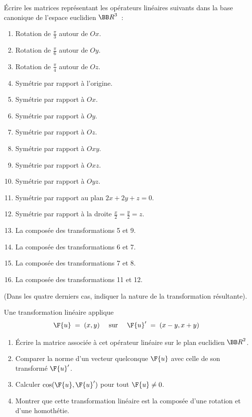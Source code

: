 \documentclass[12pt,french,oneside,a4paper]{memoir} %
\begin{document}
\begin{exo}
Écrire les matrices représentant les opérateurs linéaires suivants dans la base canonique de l'espace euclidien ${\BB R}^3$~:
\begin{enumerate}
\item Rotation de $\frac{\pi}{3}$ autour de $Ox$. 
\item Rotation de $\frac{\pi}{6}$ autour de $Oy$. 
\item Rotation de $\frac{\pi}{4}$ autour de $Oz$. 
\item Symétrie par rapport à l'origine.
\item Symétrie par rapport à $Ox$.
\item Symétrie par rapport à $Oy$.
\item Symétrie par rapport à $Oz$.
\item Symétrie par rapport à $Oxy$.
\item Symétrie par rapport à $Oxz$.
\item Symétrie par rapport à $Oyz$.
\item Symétrie par rapport au plan $2x+2y+z=0$.
\item Symétrie par rapport à la droite $\displaystyle{\frac{x}{2}=\frac{y}{2}=z}$.
\item La composée des transformations 5 et 9.
\item La composée des transformations 6 et 7.
\item La composée des transformations 7 et 8.
\item La composée des transformations 11 et 12.
\end{enumerate}
(Dans les quatre derniers cas, indiquer la nature de la transformation 
résultante).
\end{exo}

\begin{exo}
Une transformation linéaire applique
\begin{equation*}
\F{u} \;=\; (x,y) \quad \mbox{ sur } \quad \F{u}' \;=\; (x-y,x+y)
\end{equation*}
\begin{enumerate}
\item Écrire la matrice associée à cet opérateur linéaire
sur le plan euclidien ${\BB R}^2$. 
\item Comparer la norme d'un vecteur quelconque $\F{u}$ avec celle de 
son transformé $\F{u}'$.
\item Calculer  $\cos (\F{u}, \F{u}')$ pour tout $\F{u} \neq 0$.
\item Montrer que cette transformation linéaire est la composée d'une 
rotation et d'une homothétie. 
\end{enumerate}
\end{exo}
\end{document}
